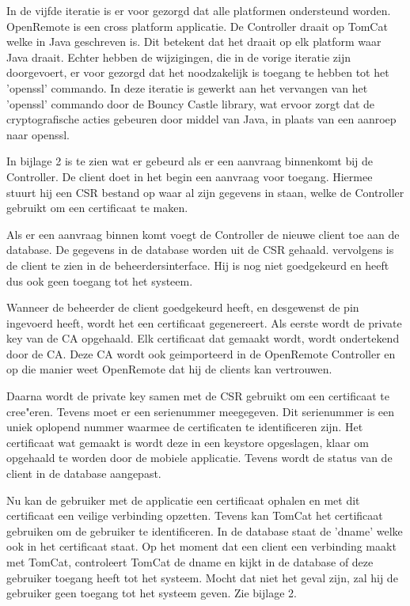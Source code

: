 \documentclass[]{article}
\begin{document}
In de vijfde iteratie is er voor gezorgd dat alle platformen ondersteund worden.
OpenRemote is een cross platform applicatie. De Controller draait op TomCat
welke in Java geschreven is. Dit betekent dat het draait op elk platform waar
Java draait. Echter hebben de wijzigingen, die in de vorige iteratie zijn
doorgevoert, er voor gezorgd dat het noodzakelijk is toegang te hebben tot
het 'openssl' commando. In deze iteratie is gewerkt aan het vervangen van het
'openssl' commando door de Bouncy Castle library, wat ervoor zorgt dat de
cryptografische acties gebeuren door middel van Java, in plaats van een aanroep
naar openssl. 

In bijlage 2 is te zien wat er gebeurd als er een
aanvraag binnenkomt bij de Controller. De client doet in het begin een aanvraag
voor toegang. Hiermee stuurt hij een CSR bestand op waar al zijn gegevens in staan,
welke de Controller gebruikt om een certificaat te maken. 

Als er een aanvraag binnen komt voegt de Controller de nieuwe client toe aan de
database. De gegevens in de database worden uit de CSR gehaald. vervolgens is de
client te zien in de beheerdersinterface. Hij is nog niet
goedgekeurd en heeft dus ook geen toegang tot het systeem.

Wanneer de beheerder de client goedgekeurd heeft, en desgewenst de pin ingevoerd
heeft, wordt het een certificaat gegenereert. Als eerste
wordt de private key van de CA opgehaald. Elk certificaat dat gemaakt wordt,
wordt ondertekend door de CA. Deze CA wordt ook geimporteerd in de OpenRemote
Controller en op die manier weet OpenRemote dat hij de clients kan vertrouwen.

Daarna wordt de private key samen met de CSR gebruikt om een certificaat te
cree"eren. Tevens moet er een serienummer meegegeven. Dit serienummer is een
uniek oplopend nummer waarmee de certificaten te identificeren zijn. Het
certificaat wat gemaakt is wordt deze in een keystore
opgeslagen, klaar om opgehaald te worden door de mobiele applicatie. Tevens wordt de
status van de client in de database aangepast.

Nu kan de gebruiker met de applicatie een certificaat ophalen en met dit
certificaat een veilige verbinding opzetten. Tevens kan TomCat het certificaat
gebruiken om de gebruiker te identificeren. In de database staat de 'dname'
welke ook in het certificaat staat. Op het moment dat een client een verbinding
maakt met TomCat, controleert TomCat de dname en kijkt in de database of deze
gebruiker toegang heeft tot het systeem. Mocht dat niet het geval zijn, zal hij
de gebruiker geen toegang tot het systeem geven.
Zie bijlage 2.
\end{document}
